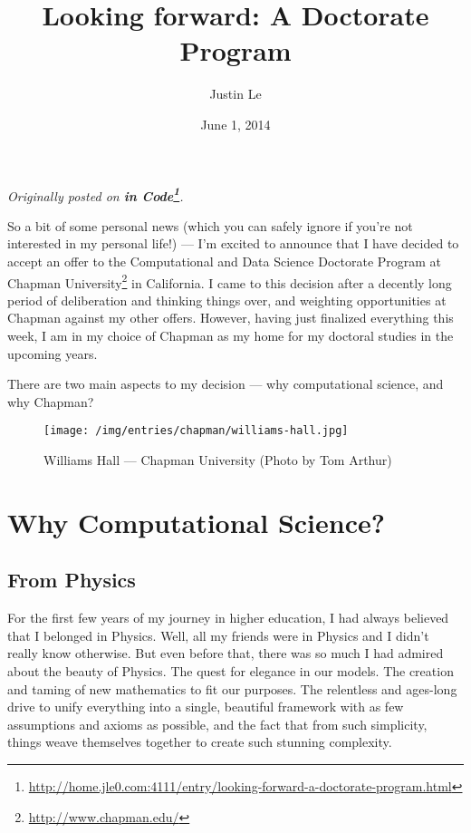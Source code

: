 \documentclass[]{article}
\title{Looking forward: A Doctorate Program}
\author{Justin Le}
\date{June 1, 2014}
\renewcommand{\href}[2]{#2\footnote{\url{#1}}}
\begin{document}
\maketitle

\emph{Originally posted on
\textbf{\href{http://home.jle0.com:4111/entry/looking-forward-a-doctorate-program.html}{in Code}}.}

So a bit of some personal news (which you can safely ignore if you're not interested in my personal
life!) --- I'm excited to announce that I have decided to accept an offer to the Computational and
Data Science Doctorate Program at \href{http://www.chapman.edu/}{Chapman University} in California.
I came to this decision after a decently long period of deliberation and thinking things over, and
weighting opportunities at Chapman against my other offers. However, having just finalized
everything this week, I am in my choice of Chapman as my home for my doctoral studies in the
upcoming years.

There are two main aspects to my decision --- why computational science, and why Chapman?

\begin{figure}[htbp]
\centering
\texttt{[image: /img/entries/chapman/williams-hall.jpg]}
\caption{Williams Hall --- Chapman University (Photo by Tom Arthur)}
\end{figure}

\section{Why Computational Science?}\label{why-computational-science}

\subsection{From Physics}\label{from-physics}

For the first few years of my journey in higher education, I had always believed that I belonged in
Physics. Well, all my friends were in Physics and I didn't really know otherwise. But even before
that, there was so much I had admired about the beauty of Physics. The quest for elegance in our
models. The creation and taming of new mathematics to fit our purposes. The relentless and ages-long
drive to unify everything into a single, beautiful framework with as few assumptions and axioms as
possible, and the fact that from such simplicity, things weave themselves together to create such
stunning complexity.
\end{document}
